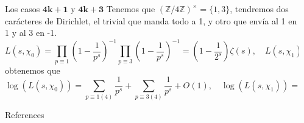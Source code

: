 \documentclass[final]{beamer}
\newcommand\Z{\ensuremath{\mathbb{Z}}}
\newlength{\sepwidth}
\newlength{\colwidth}
\newcommand{\separatorcolumn}{\begin{column}{\sepwidth}\end{column}}
\begin{document}
\begin{frame}[t,fragile]
\begin{columns}[t]
\begin{column}{\colwidth}
\begin{exampleblock}{Los casos $\mathbf{4k+1}$ y $\mathbf{4k+3}$}
    Tenemos que $(\Z/4\Z)^{\times}=\{1,3\}$, tendremos dos carácteres de Dirichlet, el trivial que manda todo a 1, y otro que envía al 1 en 1 y al 3 en -1.
    $$
L\left(s, \chi_0\right) =\prod_{p \equiv 1}\left(1-\frac{1}{p^s}\right)^{-1} \prod_{p \equiv 3}\left(1-\frac{1}{p^s}\right)^{-1}=\left(1-\frac{1}{2^s}\right) \zeta(s), \quad L\left(s, \chi_1\right)=\sum_{n=1}^{\infty} \frac{\chi_1(n)}{n^s}=\sum_{n=0}^{\infty}\frac{(-1)^n}{(2 n+1)^s},
$$
obtenemos que 
$$
\log \left(L\left(s, \chi_0\right)\right)=\sum_{p \equiv 1(4)} \frac{1}{p^s}+\sum_{p \equiv 3(4)} \frac{1}{p^s}+O(1), \quad 
\log \left(L\left(s, \chi_1\right)\right)=\sum_{p \equiv 1(4)} \frac{1}{p^s}-\sum_{p \equiv 3(4)} \frac{1}{p^s}+O(1)
$$
\end{exampleblock}

\begin{block}{References}
\nocite{*}
\footnotesize{}
\end{block}
\end{column}
\separatorcolumn



\end{columns}
\end{frame}
\end{document}
